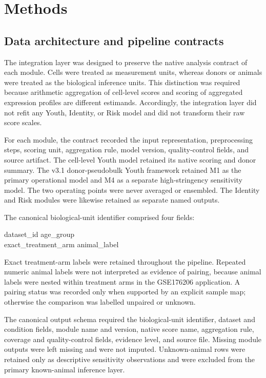 \documentclass[10pt,twocolumn]{article}
\begin{document}
\setcounter{section}{3}
\section{Methods}

\subsection{Data architecture and pipeline contracts}
\label{sec:data-architecture-contracts}

The integration layer was designed to preserve the native analysis contract of
each module. Cells were treated as measurement units, whereas donors or animals
were treated as the biological inference units. This distinction was required
because arithmetic aggregation of cell-level scores and scoring of aggregated
expression profiles are different estimands. Accordingly, the integration layer
did not refit any Youth, Identity, or Risk model and did not transform their raw
score scales.

For each module, the contract recorded the input representation, preprocessing
steps, scoring unit, aggregation rule, model version, quality-control fields, and
source artifact. The cell-level Youth model retained its native scoring and donor
summary. The v3.1 donor-pseudobulk Youth framework retained M1 as the primary
operational model and M4 as a separate high-stringency sensitivity model. The two
operating points were never averaged or ensembled. The Identity and Risk modules
were likewise retained as separate named outputs.

The canonical biological-unit identifier comprised four fields:
\begin{center}
\small\ttfamily
dataset\_id \textbar{} age\_group \textbar{}\\
exact\_treatment\_arm \textbar{} animal\_label
\end{center}
\noindent Exact treatment-arm labels were retained throughout the pipeline.
Repeated numeric animal labels were not interpreted as evidence of pairing,
because animal labels were nested within treatment arms in the GSE176206
application. A pairing status was recorded only when supported by an explicit
sample map; otherwise the comparison was labelled unpaired or unknown.

The canonical output schema required the biological-unit identifier, dataset and
condition fields, module name and version, native score name, aggregation rule,
coverage and quality-control fields, evidence level, and source file. Missing
module outputs were left missing and were not imputed. Unknown-animal rows were
retained only as descriptive sensitivity observations and were excluded from the
primary known-animal inference layer.
\end{document}
